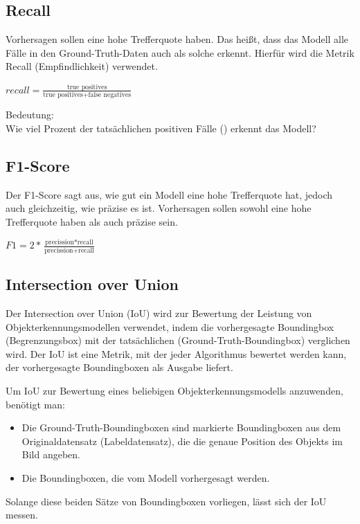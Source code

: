         \subsection{Recall}
            Vorhersagen sollen eine hohe Trefferquote haben. Das heißt, dass das Modell alle  Fälle in  den Ground-Truth-Daten
            auch als solche erkennt. Hierfür wird die Metrik Recall (Empfindlichkeit) verwendet.\newline
            \begin{center}  
                \large$recall = \frac{\text{true positives}}{\text{true positives} + \text{false negatives}}$\\
            \end{center}
            Bedeutung:\\
            Wie viel Prozent der tatsächlichen positiven Fälle () erkennt das Modell?
            \bigskip    
        \subsection{F1-Score}
            Der F1-Score sagt aus, wie gut ein Modell eine hohe Trefferquote hat, jedoch auch gleichzeitig, wie präzise es
            ist. Vorhersagen sollen sowohl eine hohe Trefferquote haben als auch präzise sein.\newline
            \begin{center} 
                \large$F1 = 2 * \frac{\text{precission} * \text{recall}}{\text{precission} + \text{recall}}$\\
            \end{center}
            
\newpage
    \subsection{Intersection over Union}
        \cite{iou, iou_paper, iou_2} Der Intersection over Union (IoU) wird zur Bewertung der Leistung von Objekterkennungsmodellen verwendet, indem die vorhergesagte Boundingbox (Begrenzungsbox) mit der tatsächlichen (Ground-Truth-Boundingbox) verglichen wird.
        Der IoU ist eine Metrik, mit der jeder Algorithmus bewertet werden kann, der vorhergesagte Boundingboxen als Ausgabe liefert.

        Um IoU zur Bewertung eines beliebigen Objekterkennungsmodells anzuwenden, benötigt man:

        \begin{itemize}
            \item Die Ground-Truth-Boundingboxen sind markierte Boundingboxen aus dem Originaldatensatz (Labeldatensatz), die die genaue Position des Objekts im Bild angeben.
            \item Die Boundingboxen, die vom Modell vorhergesagt werden.
        \end{itemize}
        Solange diese beiden Sätze von Boundingboxen vorliegen, lässt sich der IoU messen.

